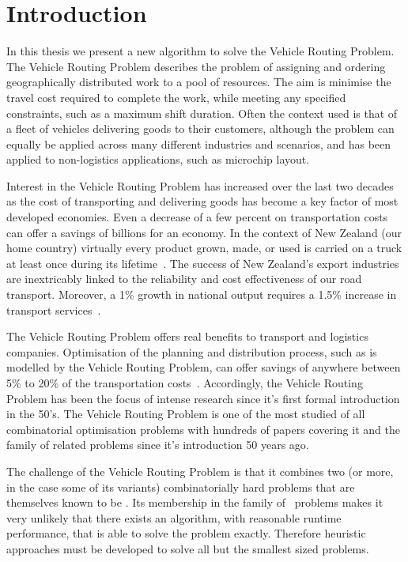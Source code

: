 
\chapter{Introduction}

In this thesis we present a new algorithm to solve the Vehicle Routing Problem. The Vehicle Routing Problem describes the problem of assigning and ordering geographically distributed work to a pool of resources. The aim is minimise the travel cost required to complete the work, while meeting any specified constraints, such as a maximum shift duration. Often the context used is that of a fleet of vehicles delivering goods to their customers, although the problem can equally be applied across many different industries and scenarios, and has been applied to non-logistics applications, such as microchip layout. 

Interest in the Vehicle Routing Problem has increased over the last two decades as the cost of transporting and delivering goods has become a key factor of most developed economies. Even a decrease of a few percent on transportation costs can offer a savings of billions for an economy. In the context of New Zealand (our home country) virtually every product grown, made, or used is carried on a truck at least once during its lifetime~\cite{RTFNZ}. The success of New Zealand's export industries are inextricably linked to the reliability and cost effectiveness of our road transport. Moreover, a 1\% growth in national output requires a 1.5\% increase in transport services~\cite{RTFNZ}. 

The Vehicle Routing Problem offers real benefits to transport and logistics companies. Optimisation of the planning and distribution process, such as is modelled by the Vehicle Routing Problem, can offer savings of anywhere between 5\% to 20\% of the transportation costs~\cite{TV2001}. Accordingly, the Vehicle Routing Problem has been the focus of intense research since it's first formal introduction in the 50's. The Vehicle Routing Problem is one of the most studied of all combinatorial optimisation problems with hundreds of papers covering it and the family of related problems since it's introduction 50 years ago.

The challenge of the Vehicle Routing Problem is that it combines two (or more, in the case some of its variants) combinatorially hard problems that are themselves known to be \nphard. Its membership in the family of \nphard\ problems makes it very unlikely that there exists an algorithm, with reasonable runtime performance, that is able to solve the problem exactly. Therefore heuristic approaches must be developed to solve all but the smallest sized problems.

